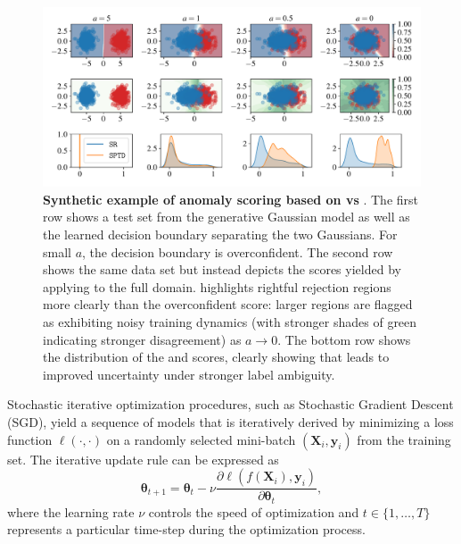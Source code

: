 \begin{figure}
    \centering
    \includegraphics[width=0.97\linewidth]{figs/sptd/gaussians_anom2.pdf}
    \caption[Synthetic example of anomaly scoring based on \sr vs \sptd.]{\textbf{Synthetic example of anomaly scoring based on \sr vs \sptd}. The first row shows a test set from the generative Gaussian model as well as the learned decision boundary separating the two Gaussians. For small $a$, the decision boundary is overconfident. The second row shows the same data set but instead depicts the scores yielded by applying \sptd to the full domain. \sptd highlights rightful rejection regions more clearly than the overconfident \sr score: larger regions are flagged as exhibiting noisy training dynamics (with stronger shades of green indicating stronger disagreement) as $a \rightarrow 0$. 
    The bottom row shows the distribution of the \sr and \sptd scores, clearly showing that \sptd leads to improved uncertainty under stronger label ambiguity.}
    \label{fig:gauss}
\end{figure}


Stochastic iterative optimization procedures, such as Stochastic Gradient Descent (SGD), yield a sequence of models that is iteratively derived by minimizing a loss function $\ell(\cdot,\cdot)$ on a randomly selected mini-batch $(\bm{X}_i, \bm{y}_i)$ from the training set. The iterative update rule can be expressed as %
\begin{equation}
    \bm{\theta}_{t+1} = \bm{\theta}_{t} - \nu \frac{\partial \ell(f(\bm{X}_i), \bm{y}_i)}{\partial \bm{\theta}_{t}},
\end{equation}
where the learning rate $\nu$ controls the speed of optimization and $t \in \{1,\ldots,T\}$ represents a particular time-step during the optimization process.

